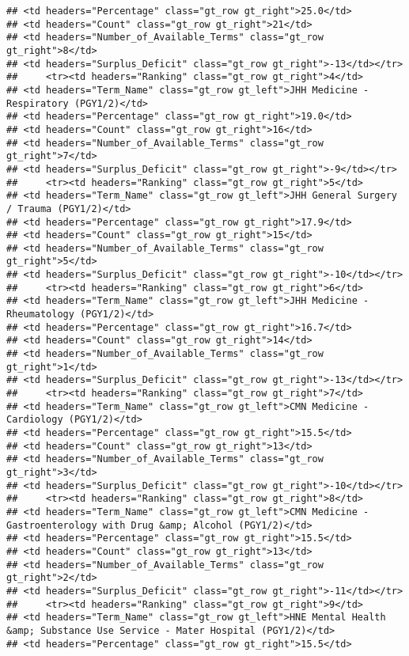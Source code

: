 \documentclass[
]{article}
\begin{document}
\begin{verbatim}
## <td headers="Percentage" class="gt_row gt_right">25.0</td>
## <td headers="Count" class="gt_row gt_right">21</td>
## <td headers="Number_of_Available_Terms" class="gt_row gt_right">8</td>
## <td headers="Surplus_Deficit" class="gt_row gt_right">-13</td></tr>
##     <tr><td headers="Ranking" class="gt_row gt_right">4</td>
## <td headers="Term_Name" class="gt_row gt_left">JHH Medicine - Respiratory (PGY1/2)</td>
## <td headers="Percentage" class="gt_row gt_right">19.0</td>
## <td headers="Count" class="gt_row gt_right">16</td>
## <td headers="Number_of_Available_Terms" class="gt_row gt_right">7</td>
## <td headers="Surplus_Deficit" class="gt_row gt_right">-9</td></tr>
##     <tr><td headers="Ranking" class="gt_row gt_right">5</td>
## <td headers="Term_Name" class="gt_row gt_left">JHH General Surgery / Trauma (PGY1/2)</td>
## <td headers="Percentage" class="gt_row gt_right">17.9</td>
## <td headers="Count" class="gt_row gt_right">15</td>
## <td headers="Number_of_Available_Terms" class="gt_row gt_right">5</td>
## <td headers="Surplus_Deficit" class="gt_row gt_right">-10</td></tr>
##     <tr><td headers="Ranking" class="gt_row gt_right">6</td>
## <td headers="Term_Name" class="gt_row gt_left">JHH Medicine - Rheumatology (PGY1/2)</td>
## <td headers="Percentage" class="gt_row gt_right">16.7</td>
## <td headers="Count" class="gt_row gt_right">14</td>
## <td headers="Number_of_Available_Terms" class="gt_row gt_right">1</td>
## <td headers="Surplus_Deficit" class="gt_row gt_right">-13</td></tr>
##     <tr><td headers="Ranking" class="gt_row gt_right">7</td>
## <td headers="Term_Name" class="gt_row gt_left">CMN Medicine - Cardiology (PGY1/2)</td>
## <td headers="Percentage" class="gt_row gt_right">15.5</td>
## <td headers="Count" class="gt_row gt_right">13</td>
## <td headers="Number_of_Available_Terms" class="gt_row gt_right">3</td>
## <td headers="Surplus_Deficit" class="gt_row gt_right">-10</td></tr>
##     <tr><td headers="Ranking" class="gt_row gt_right">8</td>
## <td headers="Term_Name" class="gt_row gt_left">CMN Medicine - Gastroenterology with Drug &amp; Alcohol (PGY1/2)</td>
## <td headers="Percentage" class="gt_row gt_right">15.5</td>
## <td headers="Count" class="gt_row gt_right">13</td>
## <td headers="Number_of_Available_Terms" class="gt_row gt_right">2</td>
## <td headers="Surplus_Deficit" class="gt_row gt_right">-11</td></tr>
##     <tr><td headers="Ranking" class="gt_row gt_right">9</td>
## <td headers="Term_Name" class="gt_row gt_left">HNE Mental Health &amp; Substance Use Service - Mater Hospital (PGY1/2)</td>
## <td headers="Percentage" class="gt_row gt_right">15.5</td>

\end{verbatim}
\end{document}
